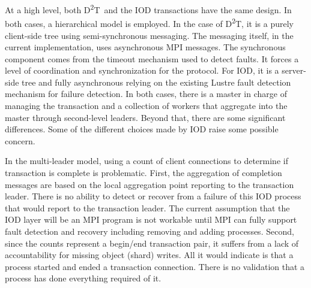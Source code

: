 \documentclass[conference]{IEEEtran}
\newcommand{\DDT}{D\textsuperscript{2}T~}
\newcommand{\DDTns}{D\textsuperscript{2}T}
\begin{document}
At a high level, both \DDT and the IOD transactions have the same design. In
both cases, a hierarchical model is employed. In the case of \DDTns, it is a
purely client-side tree using semi-synchronous messaging. The messaging itself,
in the current implementation, uses asynchronous MPI messages. The synchronous
component comes from the timeout mechanism used to detect faults.  It forces a
level of coordination and synchronization for the protocol. For IOD, it is a
server-side tree and fully asynchronous relying on the existing Lustre fault
detection mechanism for failure detection. In both cases, there is a master in
charge of managing the transaction and a collection of workers that aggregate
into the master through second-level leaders. Beyond that, there are some
significant differences. Some of the different choices made by IOD raise some
possible concern.

In the multi-leader model, using a count of client connections to determine if
transaction is complete is problematic. First, the aggregation of completion
messages are based on the local aggregation point reporting to the transaction
leader.  There is no ability to detect or recover from a failure of this IOD
process that would report to the transaction leader. The current assumption
that the IOD layer will be an MPI program is not workable until MPI can fully
support fault detection and recovery including removing and adding processes.
Second, since the counts represent a begin/end transaction pair, it suffers
from a lack of accountability for missing object (shard) writes. All it would
indicate is that a process started and ended a transaction connection. There is
no validation that a process has done everything required of it.
\end{document}

